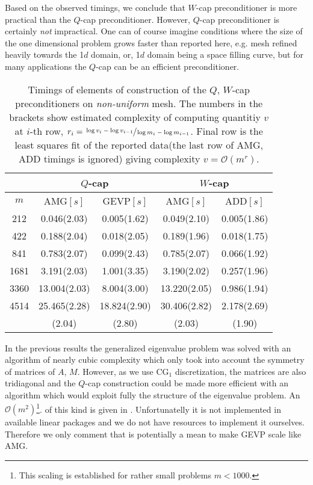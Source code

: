 \documentclass[10pt, a4paper]{article}
\begin{document}
Based on the observed timings, we conclude that $W$-cap preconditioner is more
practical than the $Q$-cap preconditioner. However, $Q$-cap preconditioner is
certainly \textit{not} impractical. One can of course imagine conditions where
the size of the one dimensional problem grows faster than reported here, e.g.
mesh refined heavily towards the 1$d$ domain, or, 1$d$ domain being a space
filling curve, but for many applications the $Q$-cap can be an efficient 
preconditioner.
%
\begin{table}[ht]
  \caption{Timings of elements of construction of the $Q$, $W$-cap
  preconditioners on \textit{non-uniform} mesh. The numbers in the brackets show 
  estimated complexity of computing quantitiy $v$ at $i$-th row,
  $r_i=\sfrac{\log{v_i}-\log{v_{i-1}}}{\log{m_i}-\log{m_{i-1}}}$. Final row is
  the least squares fit of the reported data(the last row of AMG, ADD
  timings is ignored) giving complexity $v=\mathcal{O}(m^r)$.}
\label{tab:timings_nonunif}
\footnotesize{
\begin{tabular}{c|cccc}
\hline
 & \multicolumn{2}{c|}{$Q$-cap} & \multicolumn{2}{c}{$W$-cap}\\
\hline
  $m$ & AMG$\left[s\right]$ & GEVP$\left[s\right]$ & AMG$\left[s\right]$ & ADD$\left[s\right]$ \\
\hline
212 & 0.046(2.03) & 0.005(1.62) & 0.049(2.10) & 0.005(1.86)\\
422 & 0.188(2.04) & 0.018(2.05) & 0.189(1.96) & 0.018(1.75)\\
841 & 0.783(2.07) & 0.099(2.43) & 0.785(2.07) & 0.066(1.92)\\
1681 & 3.191(2.03) & 1.001(3.35) & 3.190(2.02) & 0.257(1.96)\\
3360 & 13.004(2.03) & 8.004(3.00) & 13.220(2.05) & 0.986(1.94)\\
4514 & 25.465(2.28) & 18.824(2.90) & 30.406(2.82) & 2.178(2.69)\\
\hline
  &  (2.04) & (2.80) & (2.03) &  (1.90)\\
\hline
\end{tabular}
}
\end{table}

In the previous results the generalized eigenvalue problem was solved with an
algorithm of nearly cubic complexity which only took into account the symmetry of 
matrices of $A$, $M$. However, as we use CG$_1$ discretization, the matrices
are also tridiagonal and the $Q$-cap construction could be made more efficient
with an algorithm which would exploit fully the structure of the eigenvalue problem.
An $\mathcal{O}(m^2)$\footnote{This scaling is established for rather small
problems $m<1000$.}. of this kind is given in \cite{gevp_s3d}. Unfortunatelly it
is not implemented in available linear packages and we do not have resources to
implement it ourselves. Therefore we only comment that \cite{gevp_s3d} is potentially 
a mean to make GEVP scale like AMG.
\end{document}
